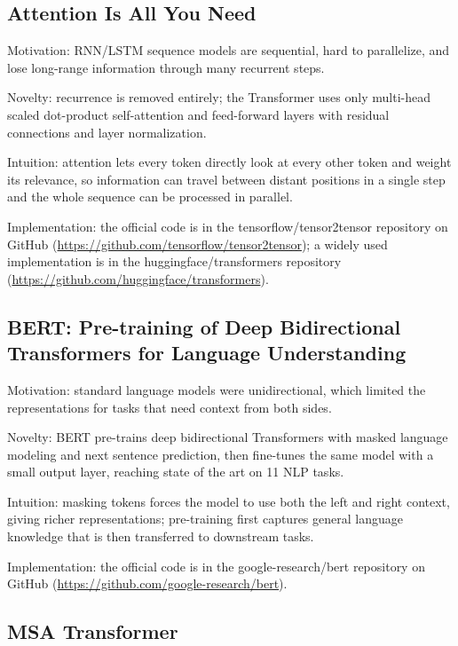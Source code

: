 \documentclass[11pt,a4paper]{article}
\begin{document}
\subsection*{Attention Is All You Need}

Motivation: RNN/LSTM sequence models are sequential, hard to
parallelize, and lose long-range information through many recurrent
steps.

Novelty: recurrence is removed entirely; the Transformer uses only
multi-head scaled dot-product self-attention and feed-forward layers
with residual connections and layer normalization.

Intuition: attention lets every token directly look at every other token
and weight its relevance, so information can travel between distant
positions in a single step and the whole sequence can be processed in
parallel.

Implementation: the official code is in the tensorflow/tensor2tensor
repository on GitHub (\url{https://github.com/tensorflow/tensor2tensor}); a
widely used implementation is in the huggingface/transformers repository
(\url{https://github.com/huggingface/transformers}).

\subsection*{BERT: Pre-training of Deep Bidirectional Transformers for
Language Understanding}

Motivation: standard language models were unidirectional, which limited
the representations for tasks that need context from both sides.

Novelty: BERT pre-trains deep bidirectional Transformers with masked
language modeling and next sentence prediction, then fine-tunes the same
model with a small output layer, reaching state of the art on 11 NLP
tasks.

Intuition: masking tokens forces the model to use both the left and
right context, giving richer representations; pre-training first
captures general language knowledge that is then transferred to
downstream tasks.

Implementation: the official code is in the google-research/bert
repository on GitHub (\url{https://github.com/google-research/bert}).

\subsection*{MSA Transformer}
\end{document}
